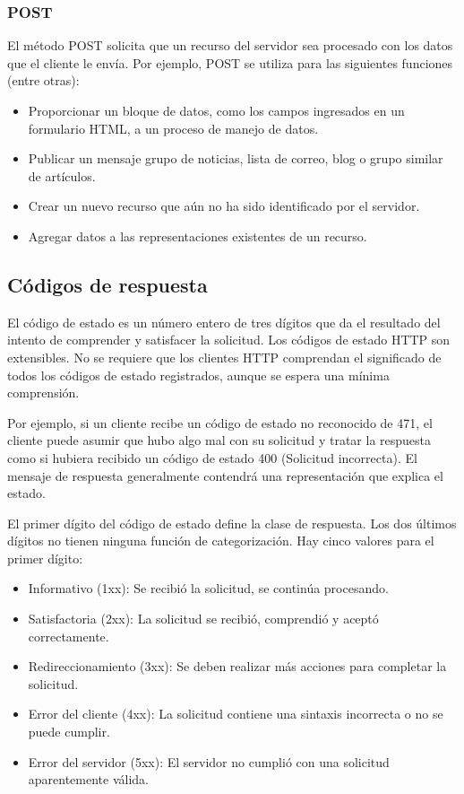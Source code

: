 \subsubsection*{POST}

El método POST solicita que un recurso del servidor sea procesado con 
los datos que el cliente le envía. Por ejemplo, POST se utiliza para 
las siguientes funciones (entre otras):

\begin{itemize}
   \setlength\itemsep{-0.6em}
   \item Proporcionar un bloque de datos, como los campos ingresados 
   en un formulario HTML, a un proceso de manejo de datos.
   \item Publicar un mensaje grupo de 
   noticias, lista de correo, blog o grupo similar de artículos.
   \item Crear un nuevo recurso que aún no ha sido identificado por 
   el servidor.
   \item Agregar datos a las representaciones existentes de un recurso.
\end{itemize}


\subsection{Códigos de respuesta} 
El código de estado es un número entero de tres dígitos que da el 
resultado del intento de comprender y satisfacer la solicitud.
   Los códigos de estado HTTP son extensibles. No se requiere que los
    clientes HTTP comprendan el significado de todos los códigos de
     estado registrados, aunque se espera una mínima comprensión.

   Por ejemplo, si un cliente recibe un código de estado no reconocido
    de \textsf{471}, el cliente puede asumir que hubo algo mal con su solicitud
     y tratar la respuesta como si hubiera recibido un código de estado
     \textsf{400} (Solicitud incorrecta). El mensaje de respuesta generalmente 
      contendrá una representación que explica el estado.

   El primer dígito del código de estado define la clase de respuesta.
    Los dos últimos dígitos no tienen ninguna función de categorización.
     Hay cinco valores para el primer dígito:

   \begin{itemize}
   \setlength\itemsep{-0.6em}
      \item Informativo (\textsf{1xx}): Se recibió la solicitud, se continúa procesando.
      \item Satisfactoria (\textsf{2xx}): La solicitud se recibió, comprendió y 
      aceptó correctamente.
      \item Redireccionamiento (\textsf{3xx}): Se deben realizar más acciones para
      completar la solicitud.
      \item Error del cliente (\textsf{4xx}): La solicitud contiene una sintaxis
      incorrecta o no se puede cumplir.
      \item Error del servidor (\textsf{5xx}): El servidor no cumplió con una
      solicitud aparentemente válida.
   \end{itemize}

